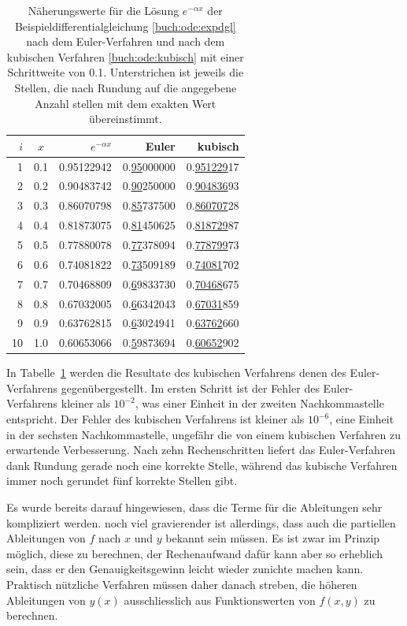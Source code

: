 \begin{table}
\centering
\begin{tabular}{|r|c|r|r|r|}
\hline
$i$&$x$&$e^{-\alpha x}$&Euler&kubisch\\
\hline
 1 & 0.1 & 0.95122942 & 0.\underline{95}000000 & 0.\underline{951229}17 \\
 2 & 0.2 & 0.90483742 & 0.\underline{90}250000 & 0.\underline{904836}93 \\
 3 & 0.3 & 0.86070798 & 0.\underline{85}737500 & 0.\underline{860707}28 \\
 4 & 0.4 & 0.81873075 & 0.\underline{81}450625 & 0.\underline{818729}87 \\
 5 & 0.5 & 0.77880078 & 0.\underline{77}378094 & 0.\underline{778799}73 \\
 6 & 0.6 & 0.74081822 & 0.\underline{73}509189 & 0.\underline{74081}702 \\
 7 & 0.7 & 0.70468809 & 0.\underline{6}9833730 & 0.\underline{70468}675 \\
 8 & 0.8 & 0.67032005 & 0.\underline{6}6342043 & 0.\underline{67031}859 \\
 9 & 0.9 & 0.63762815 & 0.\underline{6}3024941 & 0.\underline{63762}660 \\
10 & 1.0 & 0.60653066 & 0.\underline{5}9873694 & 0.\underline{60652}902 \\
\hline
\end{tabular}
\caption{Näherungswerte für die Lösung $e^{-\alpha x}$ der
Beispieldifferentialgleichung \eqref{buch:ode:expdgl} nach dem Euler-Verfahren
und nach dem kubischen Verfahren \eqref{buch:ode:kubisch} mit einer
Schrittweite von 0.1. Unterstrichen ist jeweils die Stellen, die nach
Rundung auf die angegebene Anzahl stellen mit dem exakten Wert übereinstimmt.
\label{buch:ode:euler-kubisch}}
\end{table}%
In Tabelle~\ref{buch:ode:euler-kubisch} werden die Resultate des
kubischen Verfahrens denen des Euler-Verfahrens gegenübergestellt.
Im ersten Schritt ist der Fehler des Euler-Verfahrens kleiner als $10^{-2}$,
was einer Einheit in der zweiten Nachkommastelle entspricht.
Der Fehler des kubischen Verfahrens ist kleiner als $10^{-6}$, eine
Einheit in der sechsten Nachkommastelle, ungefähr die von einem
kubischen Verfahren zu erwartende Verbesserung.
Nach zehn Rechenschritten liefert das Euler-Verfahren dank Rundung
gerade noch eine korrekte Stelle, während das kubische Verfahren immer noch
gerundet fünf korrekte Stellen gibt.

Es wurde bereits darauf hingewiesen, dass die Terme für die Ableitungen
sehr kompliziert werden.
noch viel gravierender ist allerdings, dass auch die partiellen Ableitungen
von $f$ nach $x$ und $y$ bekannt sein müssen.
Es ist zwar im Prinzip möglich, diese zu berechnen, der Rechenaufwand 
dafür kann aber so erheblich sein, dass er den Genauigkeitsgewinn
leicht wieder zunichte machen kann.
Praktisch nützliche Verfahren müssen daher danach streben,
die höheren Ableitungen von $y(x)$ ausschliesslich aus Funktionswerten
von $f(x,y)$ zu berechnen.

